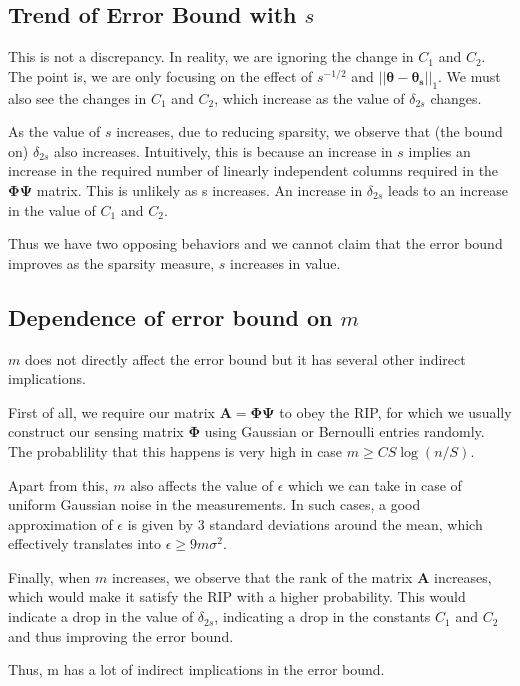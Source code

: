 \documentclass[a4paper,11pt]{article}
\numberwithin{definition}{section}
\numberwithin{mytheorem}{subsection}
\begin{document}
\subsection{Trend of Error Bound with $s$}
This is not a discrepancy. In reality, we are ignoring the change in $C_1$ and $C_2$. The point is, we are only focusing on the effect of $s^{-1/2}$ and $||\boldsymbol{\theta}-\boldsymbol{\theta_s}||_1$. We must also see the changes in $C_1$ and $C_2$, which increase as the value of $\delta_{2s}$ changes.

As the value of $s$ increases, due to reducing sparsity, we observe that (the bound on) $\delta_{2s}$ also increases. Intuitively, this is because an increase in $s$ implies an increase in the required number of linearly independent columns required in the $\boldsymbol{\Phi \Psi}$ matrix. This is unlikely as s increases. An increase in $\delta_{2s}$ leads to an increase in the value of $C_1$ and $C_2$.

Thus we have two opposing behaviors and we cannot claim that the error bound improves as the sparsity measure, $s$ increases in value.

\subsection{Dependence of error bound on $m$}

$m$ does not directly affect the error bound but it has several other indirect implications. 

First of all, we require our matrix $\boldsymbol{A}=\boldsymbol{\Phi \Psi}$ to obey the RIP, for which we usually construct our sensing matrix $\boldsymbol{\Phi}$ using Gaussian or Bernoulli entries randomly. The probablility that this happens is very high in case $m \geq CS \log(n/S)$.

Apart from this, $m$ also affects the value of $\epsilon$ which we can take in case of uniform Gaussian noise in the measurements. In such cases, a good approximation of $\epsilon$ is given by 3 standard deviations around the mean, which effectively translates into $\epsilon \geq 9m\sigma^2$.

Finally, when $m$ increases, we observe that the rank of the matrix $\boldsymbol{A}$ increases, which would make it satisfy the RIP with a higher probability. This would indicate a drop in the value of $\delta_{2s}$, indicating a drop in the constants $C_1$ and $C_2$ and thus improving the error bound.

Thus, m has a lot of indirect implications in the error bound.
\end{document}
